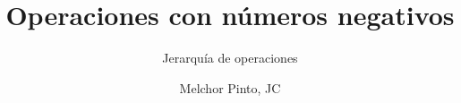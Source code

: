 \documentclass{guia}
\title{Operaciones con números negativos}
\subtitle{Jerarquía de operaciones}
\author{Melchor Pinto, JC}
\begin{document}
%
\begin{questions}
\questionboxed{}
\end{questions}
\end{document}
